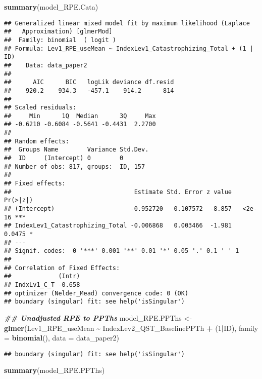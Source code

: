 \documentclass[
  12pt,
]{article}
\newenvironment{Shaded}{\begin{snugshade}}{\end{snugshade}}
\newcommand{\AttributeTok}[1]{\textcolor[rgb]{0.13,0.29,0.53}{#1}}
\newcommand{\DecValTok}[1]{\textcolor[rgb]{0.00,0.00,0.81}{#1}}
\newcommand{\DocumentationTok}[1]{\textcolor[rgb]{0.56,0.35,0.01}{\textbf{\textit{#1}}}}
\newcommand{\FunctionTok}[1]{\textcolor[rgb]{0.13,0.29,0.53}{\textbf{#1}}}
\newcommand{\NormalTok}[1]{#1}
\newcommand{\OtherTok}[1]{\textcolor[rgb]{0.56,0.35,0.01}{#1}}
\newcommand{\SpecialCharTok}[1]{\textcolor[rgb]{0.81,0.36,0.00}{\textbf{#1}}}
\begin{document}
\begin{Shaded}
\begin{Highlighting}[]
\FunctionTok{summary}\NormalTok{(model\_RPE.Cata)}
\end{Highlighting}
\end{Shaded}

\begin{verbatim}
## Generalized linear mixed model fit by maximum likelihood (Laplace
##   Approximation) [glmerMod]
##  Family: binomial  ( logit )
## Formula: Lev1_RPE_useMean ~ IndexLev1_Catastrophizing_Total + (1 | ID)
##    Data: data_paper2
## 
##      AIC      BIC   logLik deviance df.resid 
##    920.2    934.3   -457.1    914.2      814 
## 
## Scaled residuals: 
##     Min      1Q  Median      3Q     Max 
## -0.6210 -0.6084 -0.5641 -0.4431  2.2700 
## 
## Random effects:
##  Groups Name        Variance Std.Dev.
##  ID     (Intercept) 0        0       
## Number of obs: 817, groups:  ID, 157
## 
## Fixed effects:
##                                  Estimate Std. Error z value Pr(>|z|)    
## (Intercept)                     -0.952720   0.107572  -8.857   <2e-16 ***
## IndexLev1_Catastrophizing_Total -0.006868   0.003466  -1.981   0.0475 *  
## ---
## Signif. codes:  0 '***' 0.001 '**' 0.01 '*' 0.05 '.' 0.1 ' ' 1
## 
## Correlation of Fixed Effects:
##             (Intr)
## IndxLv1_C_T -0.658
## optimizer (Nelder_Mead) convergence code: 0 (OK)
## boundary (singular) fit: see help('isSingular')
\end{verbatim}

\begin{Shaded}
\begin{Highlighting}[]
\DocumentationTok{\#\# Unadjusted RPE to PPThs}
\NormalTok{model\_RPE.PPThs }\OtherTok{\textless{}{-}} \FunctionTok{glmer}\NormalTok{(Lev1\_RPE\_useMean }\SpecialCharTok{\textasciitilde{}}\NormalTok{ IndexLev2\_QST\_BaselinePPTh }\SpecialCharTok{+}\NormalTok{ (}\DecValTok{1}\SpecialCharTok{|}\NormalTok{ID), }\AttributeTok{family =} \FunctionTok{binomial}\NormalTok{(), }\AttributeTok{data =}\NormalTok{ data\_paper2)}
\end{Highlighting}
\end{Shaded}

\begin{verbatim}
## boundary (singular) fit: see help('isSingular')
\end{verbatim}

\begin{Shaded}
\begin{Highlighting}[]
\FunctionTok{summary}\NormalTok{(model\_RPE.PPThs)}
\end{Highlighting}
\end{Shaded}
\end{document}
